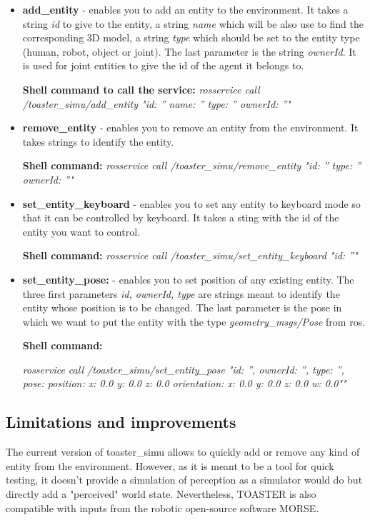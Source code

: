 \documentclass[a4paper]{article}
\begin{document}
\begin{itemize}
\item \textbf{add\_entity} - enables you to add an entity to the environment. It takes a string \textit{id} to give to the entity, a string \textit{name} which will be also use to find the corresponding 3D model, a string \textit{type} which should be set to the entity type (human, robot, object or joint). The last parameter is the string \textit{ownerId}. It is used for joint entities to give the id of the agent it belongs to.

\textbf{Shell command to call the service:}
\textit{rosservice call /toaster\_simu/add\_entity "id: ''
name: ''
type: ''
ownerId: ''"}


\item \textbf{remove\_entity} - enables you to remove an entity from the environment. It takes strings to identify the entity.

\textbf{Shell command:}
\textit{rosservice call /toaster\_simu/remove\_entity "id: ''
type: ''
ownerId: ''"}

\item \textbf{set\_entity\_keyboard} - enables you to set any entity to keyboard mode so that it can be controlled by keyboard. It takes a sting with the id of the entity you want to control.

\textbf{Shell command:}
\textit{rosservice call /toaster\_simu/set\_entity\_keyboard "id: ''"}

\item \textbf{set\_entity\_pose:} - enables you to set position of any existing entity. The three first parameters \textit{id, ownerId, type} are strings meant to identify the entity whose position is to be changed. The last parameter is the pose in which we want to put the entity with the type \textit{geometry\_msgs/Pose} from ros.

\textbf{Shell command:}

\textit{ rosservice call /toaster\_simu/set\_entity\_pose "{id: '', 
 ownerId: '', 
 type: '', 
 pose:
  position:
    x: 0.0
    y: 0.0
    z: 0.0
  orientation:
    x: 0.0
    y: 0.0
    z: 0.0
    w: 0.0"}" }
 
 
\end{itemize}


\subsection{Limitations and improvements}
The current version of toaster\_simu allows to quickly add or remove any kind of entity from the environment. However, as it is meant to be a tool for quick testing, it doesn't provide a simulation of perception as a simulator would do but directly add a "perceived" world state. Nevertheless, TOASTER  is also compatible with inputs from the robotic open-source software MORSE.
\end{document}
